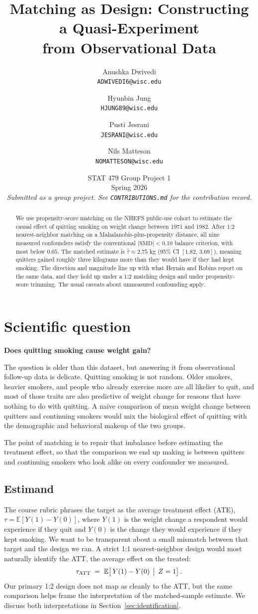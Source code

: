 \documentclass[11pt]{article}
\title{Matching as Design: Constructing a Quasi-Experiment\\ from Observational Data}
\author{
Anushka Dwivedi\\\small\texttt{ADWIVEDI6@wisc.edu}
\and
Hyunbin Jung\\\small\texttt{HJUNG89@wisc.edu}
\and
Pusti Jesrani\\\small\texttt{JESRANI@wisc.edu}
\and
Nils Matteson\\\small\texttt{NOMATTESON@wisc.edu}
}
\date{STAT 479 Group Project 1 \\ Spring 2026 \\[0.4em]
\small\textit{Submitted as a group project. See
\texttt{CONTRIBUTIONS.md} for the contribution record.}}
\begin{document}
\maketitle

\begin{abstract}
\noindent
We use propensity-score matching on the NHEFS public-use cohort to estimate
the causal effect of quitting smoking on weight change between 1971 and
1982. After 1:2 nearest-neighbor matching on a Mahalanobis-plus-propensity
distance, all nine measured confounders satisfy the conventional
$|\mathrm{SMD}| < 0.10$ balance criterion, with most below $0.05$.
The matched estimate is $\hat{\tau} \approx 2.75$ kg
(95\% CI $[1.82,\,3.69]$), meaning quitters gained roughly three
kilograms more than they would have if they had kept smoking. The
direction and magnitude line up with what Hern\'an and Robins report on
the same data, and they hold up under a 1:2 matching design and under
propensity-score trimming. The usual caveats about unmeasured confounding
apply.
\end{abstract}

\tableofcontents

\section{Scientific question}

\textbf{Does quitting smoking cause weight gain?}

The question is older than this dataset, but answering it from observational
follow-up data is delicate. Quitting smoking is not random. Older smokers,
heavier smokers, and people who already exercise more are all likelier to
quit, and most of those traits are also predictive of weight change for
reasons that have nothing to do with quitting. A naive comparison of mean
weight change between quitters and continuing smokers would mix the
biological effect of quitting with the demographic and behavioral makeup of
the two groups.

The point of matching is to repair that imbalance before estimating the
treatment effect, so that the comparison we end up making is between
quitters and continuing smokers who look alike on every confounder we
measured.

\subsection{Estimand}

The course rubric phrases the target as the average treatment effect (ATE),
$\tau = \mathbb{E}[Y(1) - Y(0)]$, where $Y(1)$ is the weight change a
respondent would experience if they quit and $Y(0)$ is the change they
would experience if they kept smoking. We want to be transparent about a
small mismatch between that target and the design we ran. A strict 1:1
nearest-neighbor design would most naturally identify the ATT, the average effect on the treated:
$$
\tau_{\text{ATT}}
\;=\;
\mathbb{E}\!\left[\,Y(1) - Y(0)\,\bigm|\,Z = 1\right].
$$
Our primary 1:2 design does not map as cleanly to the ATT, but the same
comparison helps frame the interpretation of the matched-sample estimate.
We discuss both interpretations in Section~\ref{sec:identification}.
\end{document}
